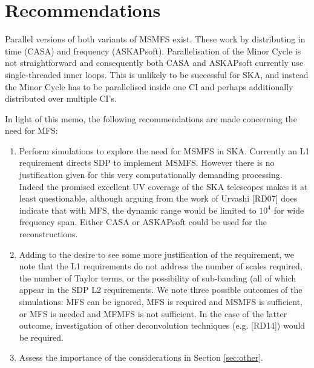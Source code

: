 \documentclass[11pt,a4paper,variablewidth]{article}
\begin{document}
\clearpage
\section{Recommendations}
\label{sec:recommendations}

Parallel versions of both variants of MSMFS exist. These work by distributing in time (CASA) and frequency (ASKAPsoft). Parallelisation of the Minor Cycle is not straightforward and consequently both CASA and ASKAPsoft currently use single-threaded inner loops. This is unlikely to be successful for SKA, and instead the Minor Cycle has to be parallelised inside one CI and perhaps additionally distributed over multiple CI's.

In light of this memo, the following recommendations are made concerning the need for MFS:

\begin{enumerate}
\item Perform simulations to explore the need for MSMFS in SKA. Currently an L1 requirement directs SDP to implement MSMFS. However there is no justification given for this very computationally demanding processing. Indeed the promised excellent UV coverage of the SKA telescopes makes it at least questionable, although arguing from the work of Urvashi [RD07] does indicate that with MFS, the dynamic range would be limited to $10^4$ for wide frequency span. Either CASA or ASKAPsoft could be used for the reconstructions.
\item Adding to the desire to see some more justification of the requirement, we note that the L1 requirements do not address the number of scales required, the number of Taylor terms, or the possibility of sub-banding (all of which appear in the SDP L2 requirements. We note three possible outcomes of the simulations: MFS can be ignored, MFS is required and MSMFS is sufficient, or MFS is needed and MFMFS is not sufficient. In the case of the latter outcome, investigation of other deconvolution techniques (e.g. [RD14]) would be required.
\item Assess the importance of the considerations in Section \ref{sec:other}.
\end{enumerate}
\end{document}
